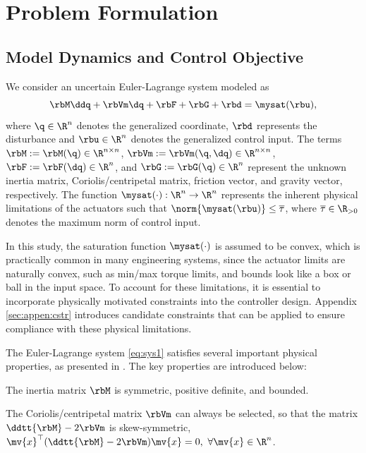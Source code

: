 \documentclass[journal]{IEEEtran}
\begin{document}
\section{Problem Formulation}\label{sec:Problem Formulation}

\subsection{Model Dynamics and Control Objective}

We consider an uncertain Euler-Lagrange system modeled as
\begin{equation}
    \rbM\ddq +\rbVm \dq+ \rbF + \rbG + \rbd
    =
    \mysat(\rbu)
    ,
    \label{eq:sys1}
\end{equation}
where $\q\in \R^n$ denotes the generalized coordinate, $\rbd$ represents the disturbance and $\rbu\in\R^n$ denotes the generalized control input. 
The terms $\rbM:=\rbM(\q)\in\R^{n\times n}$, $\rbVm:=\rbVm(\q,\dq)\in\R^{n\times n}$, $\rbF:=\rbF(\dq)\in\R^{n}$, and $\rbG:=\rbG(\q)\in\R^{n}$ represent the unknown inertia matrix, Coriolis/centripetal matrix, friction vector, and gravity vector, respectively.
The function $\mysat(\cdot):\R^n\to\R^n$ represents the inherent physical limitations of the actuators such that $\norm{\mysat(\rbu)}\le \overline\tau$, where $\overline\tau\in\R_{>0}$ denotes the maximum norm of control input.

In this study, the saturation function $\mysat(\cdot)$ is assumed to be convex, which is practically common in many engineering systems, since the actuator limits are naturally convex, such as min/max torque limits, and bounds look like a box or ball in the input space.
To account for these limitations, it is essential to incorporate physically motivated constraints into the controller design.
Appendix \ref{sec:appen:cstr} introduces candidate constraints that can be applied to ensure compliance with these physical limitations.

The Euler-Lagrange system \eqref{eq:sys1} satisfies several important physical properties, as presented in \cite[Chap. 3, Tab. 3.2.1]{Lewis:1998aa}. 
The key properties are introduced below:
\begin{prop} 
    The inertia matrix $\rbM$ is symmetric, positive definite, and bounded.
    \label{prop:M}
\end{prop}

\begin{prop} 
    The Coriolis/centripetal matrix $\rbVm$ can always be selected, so that the matrix $\ddtt{\rbM}-2\rbVm$ is skew-symmetric, \ie $\mv{x}^\top(\ddtt{\rbM}-2\rbVm)\mv{x}=0,\ \forall \mv{x}\in\R^n$.
    \label{prop:skew}
\end{prop}
\end{document}
